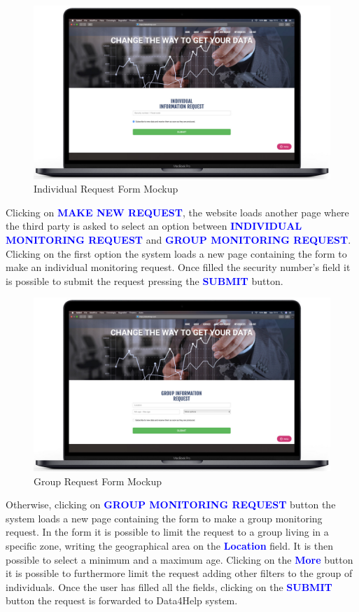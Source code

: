 \begin{enumerate}
\begin{figure}[H]
        \centering
          \includegraphics[scale = 0.33]{Images/Mockups/IndividualRequest.jpg}
          	\caption{Individual Request Form Mockup}
\end{figure}
Clicking on {\textcolor{Blue}{\textbf{MAKE NEW REQUEST}}}, the website loads another page where the third party is asked to select an option between {\textcolor{Blue}{\textbf{INDIVIDUAL MONITORING REQUEST}}} and {\textcolor{Blue}{\textbf{GROUP MONITORING REQUEST}}}. Clicking on the first option the system loads a new page containing the form to make an individual monitoring request. Once filled the security number's field it is possible to submit the request pressing the {\textcolor{Blue}{\textbf{SUBMIT}}} button.
\clearpage

\begin{figure}[H]
        \centering
          \includegraphics[scale = 0.33]{Images/Mockups/GroupRequest.jpg}
          	\caption{Group Request Form Mockup}
\end{figure}
Otherwise, clicking on {\textcolor{Blue}{\textbf{GROUP MONITORING REQUEST}}} button the system loads a new page containing the form to make a group monitoring request. In the form it is possible to limit the request to a group living in a specific zone, writing the geographical area on the {\textcolor{Blue}{\textbf{Location}}} field. It is then possible to select a minimum and a maximum age. Clicking on the {\textcolor{Blue}{\textbf{More}}} button it is possible to furthermore limit the request adding other filters to the group of individuals. Once the user has filled all the fields, clicking on the {\textcolor{Blue}{\textbf{SUBMIT}}} button the request is forwarded to Data4Help system.
\clearpage


\end{enumerate}
